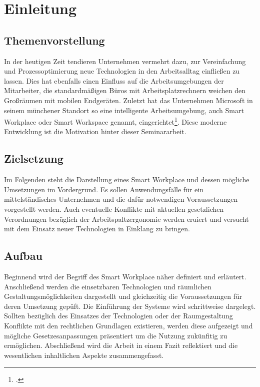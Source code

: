 \section{Einleitung}
\subsection{Themenvorstellung}
In der heutigen Zeit tendieren Unternehmen vermehrt dazu, zur Vereinfachung und Prozessoptimierung neue Technologien in den Arbeitsalltag einfließen zu lassen. Dies hat ebenfalls einen Einfluss auf die Arbeitsumgebungen der Mitarbeiter, die standardmäßigen Büros mit Arbeitsplatzrechnern weichen den Großräumen mit mobilen Endgeräten. Zuletzt hat das Unternehmen Microsoft in seinem münchener Standort so eine intelligente Arbeitsumgebung, auch Smart Workplace oder Smart Workspace genannt, eingerichtet\footcite[Vgl.][]{MicrosoftArtikel}. Diese moderne Entwicklung ist die Motivation hinter dieser Seminararbeit.

\subsection{Zielsetzung}
Im Folgenden steht die Darstellung eines Smart Workplace und dessen mögliche Umsetzungen im Vordergrund. Es sollen Anwendungsfälle für ein mittelständisches Unternehmen und die dafür notwendigen Voraussetzungen vorgestellt werden. Auch eventuelle Konflikte mit aktuellen gesetzlichen Verordnungen bezüglich der Arbeitspaltzergonomie werden eruiert und versucht mit dem Einsatz neuer Technologien in Einklang zu bringen.

\subsection{Aufbau}
Beginnend wird der Begriff des Smart Workplace näher definiert und erläutert. Anschließend werden die einsetzbaren Technologien und räumlichen Gestaltungsmöglichkeiten dargestellt und gleichzeitig die Voraussetzungen für deren Umsetzung gepüft. Die Einführung der Systeme wird schrittweise dargelegt. Sollten bezüglich des Einsatzes der Technologien oder der Raumgestaltung Konflikte mit den rechtlichen Grundlagen existieren, werden diese aufgezeigt und mögliche Gesetzesanpassungen präsentiert um die Nutzung zukünfitig zu ermöglichen. Abschließend wird die Arbeit in einem Fazit reflektiert und die wesentlichen inhaltlichen Aspekte zusammengefasst.